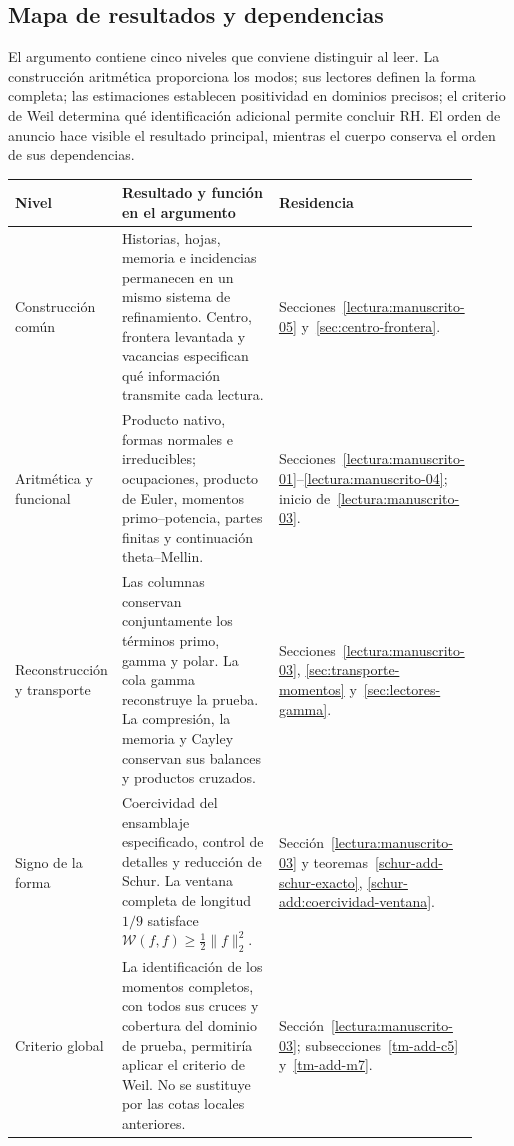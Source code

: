 \subsection*{Mapa de resultados y dependencias}
El argumento contiene cinco niveles que conviene distinguir al leer. La
construcción aritmética proporciona los modos; sus lectores definen la forma
completa; las estimaciones establecen positividad en dominios precisos; el
criterio de Weil determina qué identificación adicional permite concluir RH.
El orden de anuncio hace visible el resultado principal, mientras el cuerpo
conserva el orden de sus dependencias.

\begin{center}
\renewcommand{\arraystretch}{1.22}
\begin{tabular}{@{}p{0.21\linewidth}p{0.48\linewidth}p{0.23\linewidth}@{}}
\hline
\textbf{Nivel} & \textbf{Resultado y función en el argumento} & \textbf{Residencia}\\
\hline
Construcción común &
Historias, hojas, memoria e incidencias permanecen en un mismo sistema de
refinamiento. Centro, frontera levantada y vacancias especifican qué
información transmite cada lectura. &
Secciones~\ref{lectura:manuscrito-05} y~\ref{sec:centro-frontera}.\\
Aritmética y funcional &
Producto nativo, formas normales e irreducibles; ocupaciones, producto de
Euler, momentos primo--potencia, partes finitas y continuación theta--Mellin. &
Secciones~\ref{lectura:manuscrito-01}--\ref{lectura:manuscrito-04};
inicio de~\ref{lectura:manuscrito-03}.\\
Reconstrucción y transporte &
Las columnas conservan conjuntamente los términos primo, gamma y polar.
La cola gamma reconstruye la prueba. La compresión, la memoria y Cayley
conservan sus balances y productos cruzados. &
Secciones~\ref{lectura:manuscrito-03},
\ref{sec:transporte-momentos} y~\ref{sec:lectores-gamma}.\\
Signo de la forma &
Coercividad del ensamblaje especificado, control de detalles y reducción de
Schur. La ventana completa de longitud \(1/9\) satisface
\(\mathscr W(f,f)\geq\frac12\|f\|_2^2\). &
Sección~\ref{lectura:manuscrito-03} y
teoremas~\ref{schur-add-schur-exacto},
\ref{schur-add:coercividad-ventana}.\\
Criterio global &
La identificación de los momentos completos, con todos sus cruces y cobertura
del dominio de prueba, permitiría aplicar el criterio de Weil. No se sustituye
por las cotas locales anteriores. &
Sección~\ref{lectura:manuscrito-03};
subsecciones~\ref{tm-add-c5} y~\ref{tm-add-m7}.\\
\hline
\end{tabular}
\end{center}

